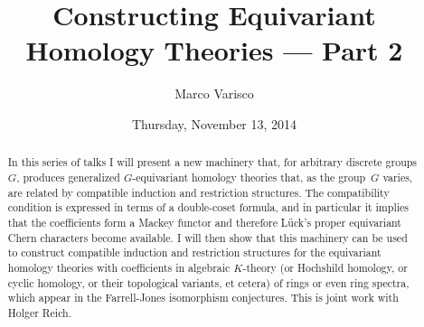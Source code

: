 \documentclass{UAmathtalk}
\author{Marco Varisco}
\title{Constructing Equivariant\\ Homology Theories --- Part 2}
\date{Thursday, November 13, 2014}
\begin{document}
\maketitle

\begin{abstract}
In this series of talks I will present a new machinery that, for arbitrary discrete groups $G$, produces generalized $G$-equivariant homology theories that, as the group~$G$ varies, are related by compatible induction and restriction structures.
The compatibility condition is expressed in terms of a double-coset formula, and in particular it implies that the coefficients form a Mackey functor and therefore L\"uck's proper equivariant Chern characters become available.
I will then show that this machinery can be used to construct compatible induction and restriction structures for the equivariant homology theories with coefficients in algebraic $K$-theory (or Hochshild homology, or cyclic homology, or their topological variants, et cetera) of rings or even ring spectra, which appear in the Farrell-Jones isomorphism conjectures.
This is joint work with Holger Reich.
\end{abstract}
\end{document}
